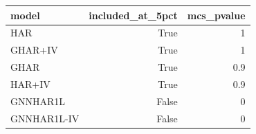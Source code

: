 \begin{tabular}{lrr}
\toprule
model & included_at_5pct & mcs_pvalue \\
\midrule
HAR & True & 1 \\
GHAR+IV & True & 1 \\
GHAR & True & 0.9 \\
HAR+IV & True & 0.9 \\
GNNHAR1L & False & 0 \\
GNNHAR1L-IV & False & 0 \\
\bottomrule
\end{tabular}
